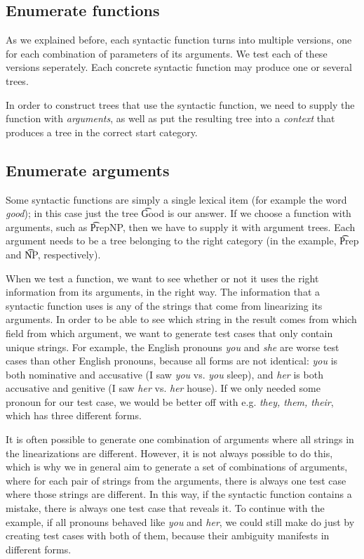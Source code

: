 \subsection{Enumerate functions} As we explained before, each syntactic
function turns into multiple versions, one for each combination of
parameters of its arguments. We test each of these versions
seperately. Each concrete syntactic function may produce one or several trees.

In order to construct trees that use the syntactic function, we need
to supply the function with \emph{arguments}, as well as put the resulting tree
into a \emph{context} that produces a tree in the correct start
category.

\subsection{Enumerate arguments} Some syntactic functions are
simply a single lexical item (for example the word \emph{good}); in
this case just the tree \t{Good} is our answer.
If we choose a function with arguments, such as \t{PrepNP}, then we have
to supply it with argument trees. Each argument needs to be a
tree belonging to the right category (in the example, \t{Prep} and
\t{NP}, respectively). 

When we test a function, we want to see whether or not it uses the
right information from its arguments, in the right way. The
information that a syntactic function uses is any of the strings that
come from linearizing its arguments. In order to be able to see which
string in the result comes from which field from which argument, we
want to generate test cases that only contain unique strings.
For example, the English pronouns {\em you} and {\em she} are worse
test cases than other English pronouns, because all forms are not
identical: {\em you} is both nominative and accusative (I saw {\em
  you} vs. {\em you} sleep), and {\em her} is both accusative and
genitive (I saw {\em her} vs. {\em her} house). 
If we only needed some pronoun for our test case, we would be better
off with e.g. {\em they, them, their}, which has three different forms. 

It is often possible to generate one combination of arguments where
all strings in the linearizations are different. However, it is not
always possible to do this, which is why we in general aim to generate
a set of combinations of arguments, where for each pair of strings
from the arguments, there is always one test case where those strings
are different. In this way, if the syntactic function contains a
mistake, there is always one test case that reveals it.
To continue with the example, if all pronouns behaved like {\em you}
and {\em her}, we could still make do just by creating test cases with
both of them, because their ambiguity manifests in different forms.

